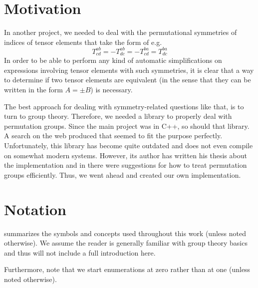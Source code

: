 \documentclass[parskip=half]{scrartcl}
\author{Robert Adam}
\date{last edited: \today}
\title{\libPerm}
\begin{document}
	\maketitle

	\tableofcontents

	\cleardoublepage


	\section{Motivation}

	In another project, we needed to deal with the permutational symmetries of indices of tensor elements that take the form of e.g.
	\begin{equation}
		T^{ab}_{cd} = - T^{ab}_{dc} = -T^{ba}_{cd} = T^{ba}_{dc}
	\end{equation}
	In order to be able to perform any kind of automatic simplifications on expressions involving tensor elements with such symmetries, it is clear
	that a way to determine if two tensor elements are equivalent (in the sense that they can be written in the form $A = \pm B$) is necessary.

	The best approach for dealing with symmetry-related questions like that, is to turn to group theory. Therefore, we needed a library to properly
	deal with permutation groups. Since the main project was in C++, so should that library. A search on the web produced \textcite{PermLib} that
	seemed to fit the purpose perfectly. Unfortunately, this library has become quite outdated and does not even compile on somewhat modern
	systems. However, its author has written his thesis about the implementation\supercite{Rehn2010} and in there were suggestions for how to treat
	permutation groups efficiently. Thus, we went ahead and created our own implementation.


	\section{Notation}

	 summarizes the symbols and concepts used throughout this work (unless noted otherwise). We assume the reader is generally
	familiar with group theory basics and thus will not include a full introduction here.

	Furthermore, note that we start enumerations at zero rather than at one (unless noted otherwise).
\end{document}
